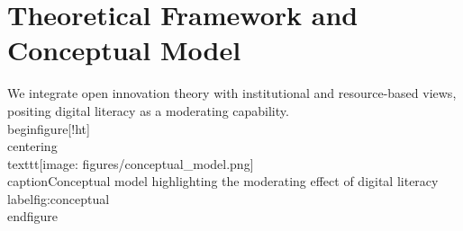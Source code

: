 \chapter{Theoretical Framework and Conceptual Model}
We integrate open innovation theory with institutional and resource-based views, positing digital literacy as a moderating capability.
\\begin{figure}[!ht]
  \\centering
  \\texttt{[image: figures/conceptual\_model.png]}
  \\caption{Conceptual model highlighting the moderating effect of digital literacy}
  \\label{fig:conceptual}
\\end{figure}
